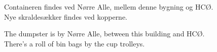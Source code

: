 \documentclass{article}
\begin{document}
\maketitle

\null
\vspace{-0.5cm}

\Huge

\vspace{-1.2cm}

\begin{center}


\vspace{-0.7cm}

{\fontsize{23}{23}\selectfont Containeren findes ved Nørre Alle, mellem denne
bygning og HCØ.\\ \vspace{-0.2cm} Nye skraldesækker findes ved kopperne.}

\vspace{-0.1cm}

\english


\vspace{-0.9cm}

{\fontsize{23}{23}\selectfont The dumpster is by Nørre Alle, between this
building and HCØ. \\ \vspace{-0.2cm} There's a roll of bin bags by the cup
trolleys.}

\end{center}

\dansk

\underskriv
\end{document}
